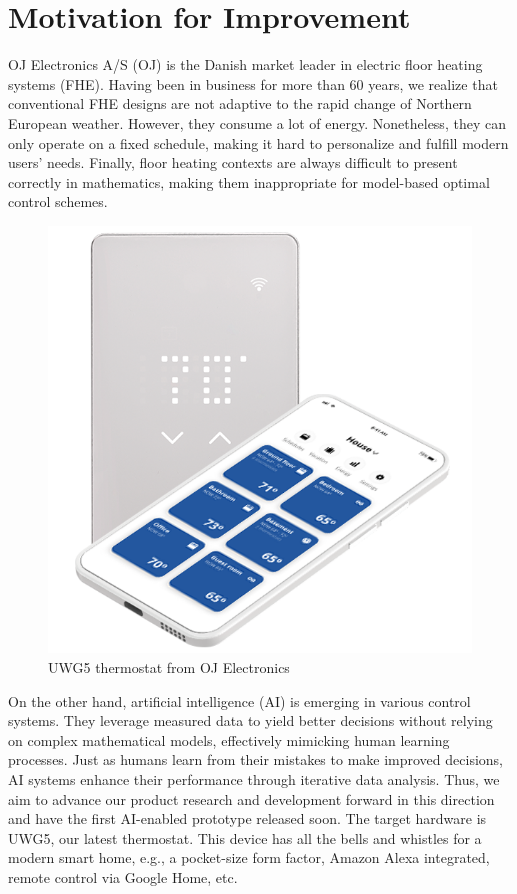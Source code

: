 \documentclass[../main.tex]{subfiles}
\begin{document}
\section{Motivation for Improvement}
OJ Electronics A/S (OJ) is the Danish market leader in electric floor heating systems (FHE). Having been in business for more than 60 years, we realize that conventional FHE designs are not adaptive to the rapid change of Northern European weather. However, they consume a lot of energy. Nonetheless, they can only operate on a fixed schedule, making it hard to personalize and fulfill modern users' needs. Finally, floor heating contexts are always difficult to present correctly in mathematics, making them inappropriate for model-based optimal control schemes.
\begin{figure}[H]
    \centering
    \includegraphics[width=0.6\linewidth]{figures/uwg5.png}
    \caption{UWG5 thermostat from OJ Electronics}
    \label{fig:uwg5}
\end{figure}

On the other hand, artificial intelligence (AI) is emerging in various control systems. They leverage measured data to yield better decisions without relying on complex mathematical models, effectively mimicking human learning processes. Just as humans learn from their mistakes to make improved decisions, AI systems enhance their performance through iterative data analysis. Thus, we aim to advance our product research and development forward in this direction and have the first AI-enabled prototype released soon. The target hardware is UWG5, our latest thermostat. This device has all the bells and whistles for a modern smart home, e.g., a pocket-size form factor, Amazon Alexa integrated, remote control via Google Home, etc.
\end{document}
